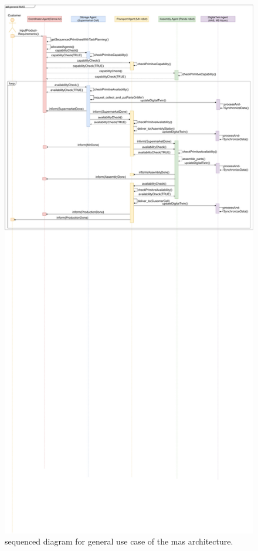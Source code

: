 \begin{figure}[htb]
    \centering
    \includegraphics[width=\textwidth]{figures/tests/usecase/SequenceUsecases.pdf}\hfill 
    \caption{sequenced diagram for general use case of the \gls{mas} architecture.} 
    \label{fig: sequence-diagram}
\end{figure}


